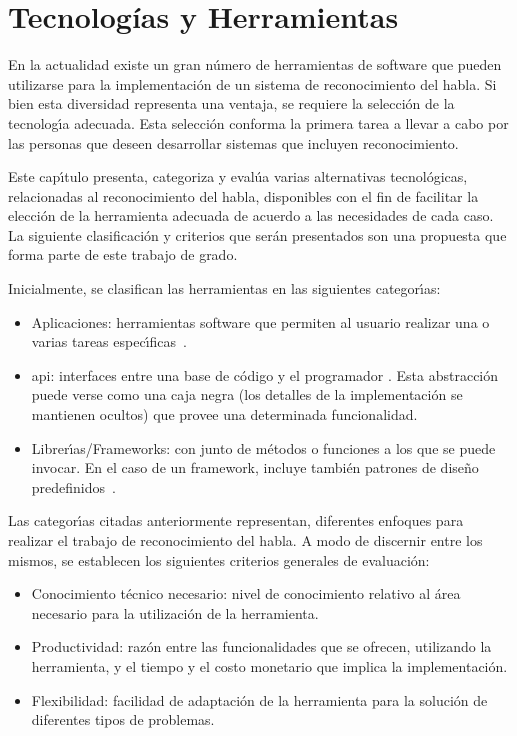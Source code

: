  \chapter{Tecnolog\'ias y Herramientas}
\label{sec:tecnologias}

En la actualidad existe un gran n\'umero de herramientas de software que pueden utilizarse para la implementaci\'on de un
sistema de reconocimiento del habla. Si bien esta diversidad representa una ventaja, se requiere
la selecci\'on de la tecnolog{\'\i}a adecuada. Esta selecci\'on conforma la primera tarea a llevar a
cabo por las personas que deseen desarrollar sistemas que incluyen reconocimiento.

Este cap{\'\i}tulo presenta, categoriza y eval\'ua varias alternativas tecnol\'ogicas, relacionadas al reconocimiento del habla, 
disponibles con el fin de facilitar la elecci\'on de la herramienta adecuada
de acuerdo a las necesidades de cada caso. La siguiente clasificaci\'on y criterios que ser\'an presentados son
una propuesta que forma parte de este trabajo de grado.

Inicialmente, se clasifican las herramientas en las siguientes categor{\'\i}as:
\begin{itemize}
	\item Aplicaciones: herramientas software que permiten al usuario realizar una o
	varias tareas \mbox{espec{\'\i}ficas \cite{GoodwillComputer}}.
    \item \gls{api}: interfaces entre una base de c\'odigo y
	el programador \cite{DoucetteOnApi}. Esta abstracci\'on puede verse como una caja negra
	(los detalles de la implementaci\'on se mantienen ocultos) que provee una determinada funcionalidad.
	\item Librer{\'\i}as/Frameworks: con junto de m\'etodos o funciones a los que se puede invocar.
	En el caso de un framework, incluye tambi\'en patrones de dise\~no
	\mbox{predefinidos \cite{FowlerInversion}}.
\end{itemize}

Las categor{\'\i}as citadas anteriormente representan, diferentes enfoques para realizar el trabajo
de reconocimiento del habla. A modo de discernir entre los mismos, se establecen
los siguientes criterios generales de evaluaci\'on:
\begin{itemize}
	\item Conocimiento t\'ecnico necesario: nivel de conocimiento relativo al \'area necesario para la
	utilizaci\'on de la herramienta. 
	\item Productividad:  raz\'on entre las funcionalidades que se ofrecen, utilizando la herramienta, 
    y el tiempo y el costo monetario que implica la implementaci\'on.
	\item Flexibilidad: facilidad de adaptaci\'on de la herramienta para la soluci\'on de diferentes
	tipos de problemas.
\end{itemize}

